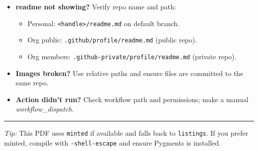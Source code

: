 \documentclass[11pt]{article}
\renewcommand{\kbd}[1]{\texttt{#1}}
\begin{document}
\begin{itemize}
  \item \textbf{readme not showing?} Verify repo name and path:
  \begin{itemize}
    \item Personal: \kbd{<handle>/readme.md} on default branch.
    \item Org public: \kbd{.github/profile/readme.md} (public repo).
    \item Org members: \kbd{.github-private/profile/readme.md} (private repo).
  \end{itemize}
  \item \textbf{Images broken?} Use relative paths and ensure files are committed to the same repo.
  \item \textbf{Action didn't run?} Check workflow path and permissions; make a manual \emph{workflow\_dispatch}.
\end{itemize}

\vfill
\hrule
\smallskip
{\footnotesize \textit{Tip:} This PDF uses \texttt{minted} if available and falls back to \texttt{listings}. If you prefer minted, compile with \texttt{-shell-escape} and ensure Pygments is installed.}
\end{document}
